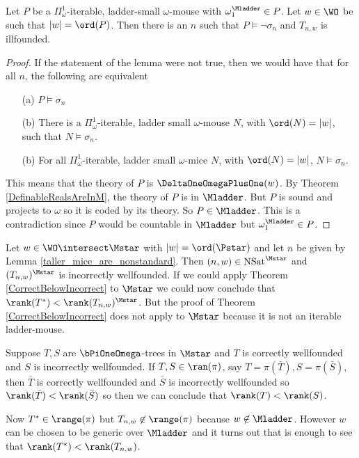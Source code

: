 \documentclass[oneside,12pt]{amsart}
\DeclareMathOperator{\NSat}{NSat}
\begin{document}
\begin{lemma}
\label{taller_mice_are_nonstandard}
Let $P$ be a  $\Pi^1_{\omega}$-iterable,
ladder-small $\omega$-mouse with $\omega_1^{\Mladder}\in P$.
Let $w\in\WO$ be such that $|w|=\ord(P)$.
Then there is an $n$ such that $P\models \neg\sigma_n$ and $T_{n,w}$ is illfounded.
\end{lemma}
\begin{proof}
If the statement of the lemma were not true, then we would have that for all $n$,
the following are equivalent
\begin{enumerate}
\item[(a)] $P\models\sigma_n$
\item[(b)] There is a $\Pi^1_{\omega}$-iterable, ladder small $\omega$-mouse $N$,
with $\ord(N)=|w|$, such that $N\models\sigma_n$.
\item[(b)] For all $\Pi^1_{\omega}$-iterable, ladder small $\omega$-mice $N$,
with $\ord(N)=|w|$, $N\models\sigma_n$.
\end{enumerate}
This means that the theory of $P$ is $\DeltaOneOmegaPlusOne(w)$. By Theorem
\ref{DefinableRealsAreInM}, the theory of $P$ is in $\Mladder$. But $P$ is
sound and projects to $\omega$ so it is coded by its theory. So
$P\in\Mladder$. This is a contradiction since $P$ would be countable in
$\Mladder$ but $\omega_1^{\Mladder}\in P$.
\end{proof}

Let $w\in\WO\intersect\Mstar$ with $|w|=\ord(\Pstar)$ and let
$n$ be given by Lemma \ref{taller_mice_are_nonstandard}. Then
$(n,w)\in \NSat^{\Mstar}$ and
$(T_{n,w})^{\Mstar}$ is incorrectly wellfounded. If we could apply
Theorem \ref{CorrectBelowIncorrect} to $\Mstar$ we could now conclude
that $\rank(T^*) < \rank(T_{n,w})^{\Mstar}$. But the proof of
Theorem \ref{CorrectBelowIncorrect} does not apply to $\Mstar$ because it is
not an iterable ladder-mouse.

Suppose $T,S$ are $\bPiOneOmega$-trees in $\Mstar$ and $T$ is correctly wellfounded
and $S$ is incorrectly wellfounded. If $T,S\in\ran(\pi)$, say
$T=\pi(\bar{T}),S=\pi(\bar{S})$, then $\bar{T}$ is correctly wellfounded and
$\bar{S}$ is incorrectly wellfounded so $\rank(\bar{T})<\rank(\bar{S})$ so
then we can conclude that $\rank(T)<\rank(S)$.

Now $T^*\in\range(\pi)$ but $T_{n,w}\not\in\range(\pi)$ because $w\not\in\Mladder$. However
$w$ can be chosen to be generic over $\Mladder$ and it turns out that is enough to see that
$\rank(T^*)<\rank(T_{n,w})$.
\end{document}
